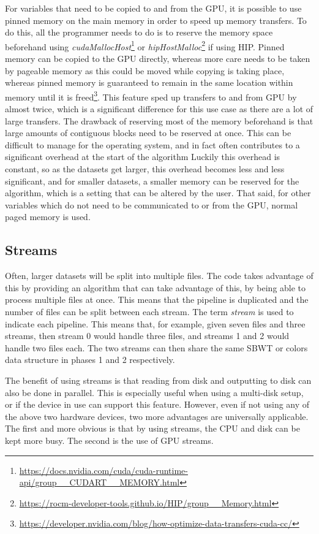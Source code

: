 For variables that need to be copied to and from the GPU, it is possible to use pinned memory on the main memory in order to speed up memory transfers.
To do this, all the programmer needs to do is to reserve the memory space beforehand using \textit{cudaMallocHost}\footnote{\url{https://docs.nvidia.com/cuda/cuda-runtime-api/group__CUDART__MEMORY.html}} or \textit{hipHostMalloc}\footnote{\url{https://rocm-developer-tools.github.io/HIP/group__Memory.html}} if using HIP.
Pinned memory can be copied to the GPU directly, whereas more care needs to be taken by pageable memory as this could be moved while copying is taking place, whereas pinned memory is guaranteed to remain in the same location within memory until it is freed\footnote{\url{https://developer.nvidia.com/blog/how-optimize-data-transfers-cuda-cc/}}.
This feature sped up transfers to and from GPU by almost twice, which is a significant difference for this use case as there are a lot of large transfers.
The drawback of reserving most of the memory beforehand is that large amounts of contiguous blocks need to be reserved at once.
This can be difficult to manage for the operating system, and in fact often contributes to a significant overhead at the start of the algorithm
Luckily this overhead is constant, so as the datasets get larger, this overhead becomes less and less significant, and for smaller datasets, a smaller memory can be reserved for the algorithm, which is a setting that can be altered by the user.
That said, for other variables which do not need to be communicated to or from the GPU, normal paged memory is used.

\subsection{Streams}

Often, larger datasets will be split into multiple files.
The code takes advantage of this by providing an algorithm that can take advantage of this, by being able to process multiple files at once.
This means that the pipeline is duplicated and the number of files can be split between each stream.
The term \textit{stream} is used to indicate each pipeline.
This means that, for example, given seven files and three streams, then stream 0 would handle three files, and streams 1 and 2 would handle two files each.
The two streams can then share the same SBWT or colors data structure in phases 1 and 2 respectively.

The benefit of using streams is that reading from disk and outputting to disk can also be done in parallel.
This is especially useful when using a multi-disk setup, or if the device in use can support this feature.
However, even if not using any of the above two hardware devices, two more advantages are universally applicable.
The first and more obvious is that by using streams, the CPU and disk can be kept more busy.
The second is the use of GPU streams.

